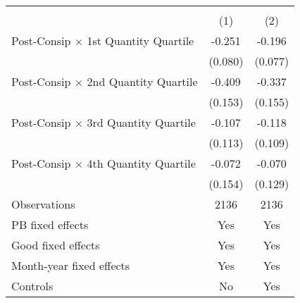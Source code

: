 \begin{tabular}{l*{2}{c}}
\hline\hline
                    &\multicolumn{2}{c}{ }    \\
                    &\multicolumn{1}{c}{(1)}&\multicolumn{1}{c}{(2)}\\
\hline
Post-Consip $\times$ 1st Quantity Quartile&      -0.251&      -0.196\\
                    &     (0.080)&     (0.077)\\
[1em]
Post-Consip $\times$ 2nd Quantity Quartile&      -0.409&      -0.337\\
                    &     (0.153)&     (0.155)\\
[1em]
Post-Consip $\times$ 3rd Quantity Quartile&      -0.107&      -0.118\\
                    &     (0.113)&     (0.109)\\
[1em]
Post-Consip $\times$ 4th Quantity Quartile&      -0.072&      -0.070\\
                    &     (0.154)&     (0.129)\\
\hline
Observations        &        2136&        2136\\
PB fixed effects    &         Yes&         Yes\\
Good fixed effects  &         Yes&         Yes\\
Month-year fixed effects&         Yes&         Yes\\
Controls            &          No&         Yes\\
\hline\hline
\end{tabular}
